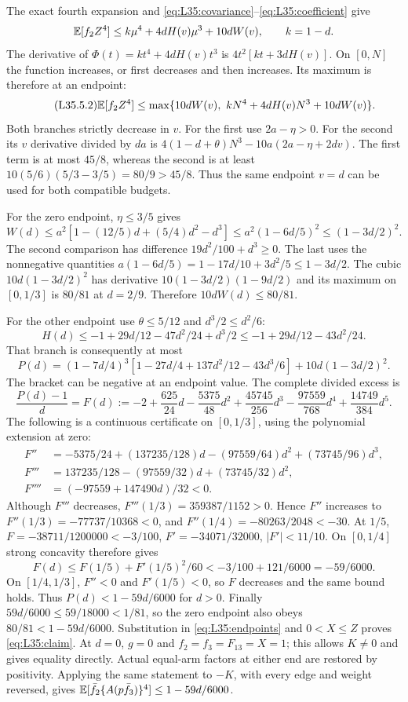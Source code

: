 The exact fourth expansion and
\eqref{eq:L35:covariance}--\eqref{eq:L35:coefficient} give
\[
\mathbb E[f_2Z^4]\le k\mu^4+4dH(v)\mu^3+10dW(v),\qquad k=1-d.
\]
The derivative of $\Phi(t)=kt^4+4dH(v)t^3$ is
$4t^2[kt+3dH(v)]$. On $[0,N]$ the function increases, or first
decreases and then increases. Its maximum is therefore at an endpoint:
\begin{equation}\tag{L35.5.2}\label{eq:L35:endpoints}
\mathbb E[f_2Z^4]\le\max\{10dW(v),\ kN^4+4dH(v)N^3+10dW(v)\}.
\end{equation}
Both branches strictly decrease in $v$. For the first use $2a-\eta>0$.
For the second its $v$ derivative divided by $da$ is
$4(1-d+\theta)N^3-10a(2a-\eta+2dv)$.
The first term is at most $45/8$, whereas the second is at least
$10(5/6)(5/3-3/5)=80/9>45/8$.
Thus the same endpoint $v=d$ can be used for both compatible budgets.

For the zero endpoint, $\eta\le3/5$ gives
\[
W(d)\le a^2[1-(12/5)d+(5/4)d^2-d^3]
\le a^2(1-6d/5)^2\le(1-3d/2)^2.
\]
The second comparison has difference $19d^2/100+d^3\ge0$.
The last uses the nonnegative quantities
$a(1-6d/5)=1-17d/10+3d^2/5\le1-3d/2$.
The cubic $10d(1-3d/2)^2$ has derivative
$10(1-3d/2)(1-9d/2)$ and its maximum on $[0,1/3]$ is $80/81$ at
$d=2/9$. Therefore $10dW(d)\le80/81$.

For the other endpoint use $\theta\le5/12$ and $d^3/2\le d^2/6$:
\[
H(d)\le-1+29d/12-47d^2/24+d^3/2
\le-1+29d/12-43d^2/24.
\]
That branch is consequently at most
\[
P(d)=(1-7d/4)^3[1-27d/4+137d^2/12-43d^3/6]
+10d(1-3d/2)^2.
\]
The bracket can be negative at an endpoint value. The complete divided excess is
\begin{equation}\tag{L35.6.5}\label{eq:L35:excess}
\frac{P(d)-1}{d}=F(d):=-2+\frac{625}{24}d-\frac{5375}{48}d^2
+\frac{45745}{256}d^3-\frac{97559}{768}d^4+\frac{14749}{384}d^5.
\end{equation}
The following is a continuous certificate on $[0,1/3]$, using the
polynomial extension at zero:
\[
\begin{aligned}
F''&=-5375/24+(137235/128)d-(97559/64)d^2+(73745/96)d^3,\\
F'''&=137235/128-(97559/32)d+(73745/32)d^2,\\
F''''&=(-97559+147490d)/32<0.
\end{aligned}
\]
Although $F'''$ decreases, $F'''(1/3)=359387/1152>0$.
Hence $F''$ increases to $F''(1/3)=-77737/10368<0$,
and $F''(1/4)=-80263/2048<-30$.
At $1/5$, $F=-38711/1200000<-3/100$,
$F'=-34071/32000$, $|F'|<11/10$.
On $[0,1/4]$ strong concavity therefore gives
\[
F(d)\le F(1/5)+F'(1/5)^2/60<-3/100+121/6000=-59/6000.
\]
On $[1/4,1/3]$, $F''<0$ and $F'(1/5)<0$, so $F$ decreases and the
same bound holds. Thus $P(d)<1-59d/6000$ for $d>0$.
Finally $59d/6000\le59/18000<1/81$, so the zero endpoint also obeys
$80/81<1-59d/6000$. Substitution in \eqref{eq:L35:endpoints} and
$0<X\le Z$ proves \eqref{eq:L35:claim}. At $d=0$, $g=0$ and
$f_2=f_3=F_{13}=X=1$; this allows $K\ne0$ and gives equality directly.
Actual equal-arm factors at either end are restored by positivity.
Applying the same statement to $-K$, with every edge and weight reversed,
gives $\mathbb E[\bar f_2\{A(p\bar f_3)\}^4]\le1-59d/6000$.
